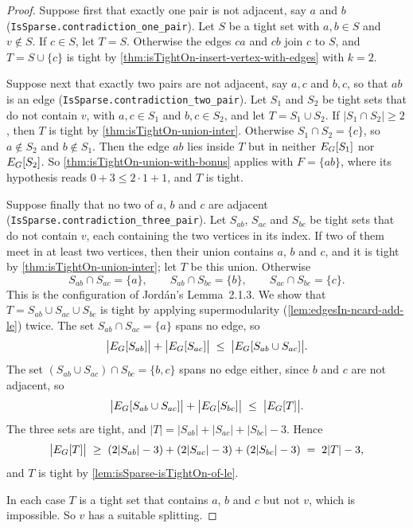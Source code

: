 \begin{proof}
  Suppose first that exactly one pair is not adjacent, say $a$ and $b$
  (\texttt{IsSparse.\allowbreak{}contradiction\_\allowbreak{}one\_\allowbreak{}pair}).
  Let $S$ be a tight set with $a, b \in S$ and $v \notin S$. If
  $c \in S$, let $T = S$. Otherwise the edges $ca$ and $cb$ join $c$ to
  $S$, and $T = S \cup \{c\}$ is tight by
  \cref{thm:isTightOn-insert-vertex-with-edges} with $k = 2$.

  Suppose next that exactly two pairs are not adjacent, say $a, c$ and
  $b, c$, so that $ab$ is an edge
  (\texttt{IsSparse.\allowbreak{}contradiction\_\allowbreak{}two\_\allowbreak{}pair}).
  Let $S_1$ and $S_2$ be tight sets
  that do not contain $v$, with $a, c \in S_1$ and $b, c \in S_2$, and
  let $T = S_1 \cup S_2$. If $|S_1 \cap S_2| \ge 2$, then $T$ is tight
  by \cref{thm:isTightOn-union-inter}. Otherwise
  $S_1 \cap S_2 = \{c\}$, so $a \notin S_2$ and $b \notin S_1$. Then
  the edge $ab$ lies inside $T$ but in neither $E_{G}[S_1]$ nor
  $E_{G}[S_2]$. So \cref{thm:isTightOn-union-with-bonus} applies with
  $F = \{ab\}$, where its hypothesis reads $0 + 3 \le 2 \cdot 1 + 1$,
  and $T$ is tight.

  Suppose finally that no two of $a$, $b$ and $c$ are adjacent
  (\texttt{IsSparse.\allowbreak{}contradiction\_\allowbreak{}three\_\allowbreak{}pair}).
  Let
  $S_{ab}$, $S_{ac}$ and $S_{bc}$ be tight sets that do not contain
  $v$, each containing the two vertices in its index. If two of them
  meet in at least two vertices, then their union contains $a$, $b$
  and $c$, and it is tight by \cref{thm:isTightOn-union-inter}; let $T$
  be this union. Otherwise
  \[
    S_{ab} \cap S_{ac} = \{a\}, \qquad
    S_{ab} \cap S_{bc} = \{b\}, \qquad
    S_{ac} \cap S_{bc} = \{c\}.
  \]
  This is the configuration of Jord\'an's Lemma~2.1.3. We show that
  $T = S_{ab} \cup S_{ac} \cup S_{bc}$ is tight by applying
  supermodularity (\cref{lem:edgesIn-ncard-add-le}) twice. The set
  $S_{ab} \cap S_{ac} = \{a\}$ spans no edge, so
  \[
    \bigl|E_{G}[S_{ab}]\bigr| + \bigl|E_{G}[S_{ac}]\bigr|
    \;\le\; \bigl|E_{G}[S_{ab} \cup S_{ac}]\bigr|.
  \]
  The set $(S_{ab} \cup S_{ac}) \cap S_{bc} = \{b, c\}$ spans no edge
  either, since $b$ and $c$ are not adjacent, so
  \[
    \bigl|E_{G}[S_{ab} \cup S_{ac}]\bigr| + \bigl|E_{G}[S_{bc}]\bigr|
    \;\le\; \bigl|E_{G}[T]\bigr|.
  \]
  The three sets are tight, and
  $|T| = |S_{ab}| + |S_{ac}| + |S_{bc}| - 3$. Hence
  \[
    \bigl|E_{G}[T]\bigr|
    \;\ge\; (2|S_{ab}| - 3) + (2|S_{ac}| - 3) + (2|S_{bc}| - 3)
    \;=\; 2|T| - 3,
  \]
  and $T$ is tight by \cref{lem:isSparse-isTightOn-of-le}.

  In each case $T$ is a tight set that contains $a$, $b$ and $c$ but
  not $v$, which is impossible. So $v$ has a suitable splitting.
\end{proof}
